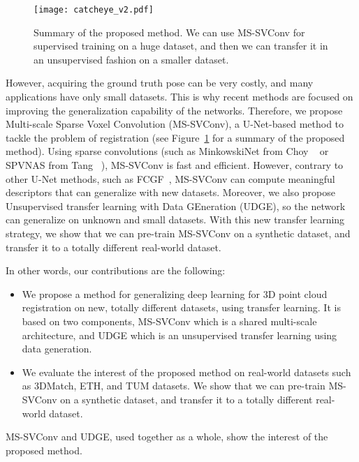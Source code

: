 \documentclass[10pt,twocolumn,letterpaper]{article}
\begin{document}
\begin{figure}[t]
    \centering
    \texttt{[image: catcheye\_v2.pdf]}
    \caption{Summary of the proposed method. We can use MS-SVConv for supervised training on a huge dataset, and then we can transfer it in an unsupervised fashion on a smaller dataset.}
    \label{fig:catcheye}
\end{figure}

However, acquiring the ground truth pose can be very costly, and many applications have only small datasets. This is why recent methods are focused on improving the generalization capability of the networks. Therefore, we propose Multi-scale Sparse
Voxel Convolution (MS-SVConv), a U-Net-based method to tackle the problem of registration (see Figure~\ref{fig:catcheye} for a summary of the proposed method). 
Using sparse convolutions (such as MinkowskiNet from Choy \etal~\cite{choy2019fully} or SPVNAS from Tang \etal~\cite{tang2020searching}), MS-SVConv is fast and efficient.
However, contrary to other U-Net methods, such as FCGF~\cite{choy2019fully}, MS-SVConv can compute meaningful descriptors that can generalize with new datasets. Moreover, we also propose Unsupervised transfer learning with Data GEneration (UDGE), so the network can generalize on unknown and small datasets.
With this new transfer learning strategy, we show that we can pre-train MS-SVConv on a synthetic dataset, and transfer it to a totally different real-world dataset.



In other words, our contributions are the following:
\begin{itemize}
    \item  We propose a method for generalizing deep learning for 3D point cloud registration on new, totally different datasets, using transfer learning. It is based on two components, MS-SVConv which is a shared multi-scale architecture, and UDGE which is an unsupervised transfer learning using data generation.
    \item We evaluate the interest of the proposed method on real-world datasets such as 3DMatch, ETH, and TUM datasets. We show that we can pre-train MS-SVConv on a synthetic dataset, and transfer it to a totally different real-world dataset.
\end{itemize}
MS-SVConv and UDGE, used together as a whole, show the interest of the proposed method. 
\end{document}
